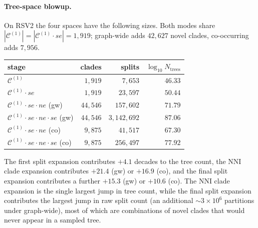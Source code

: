 \documentclass{article}
\newcommand{\CC}{\mathcal{C}}
\begin{document}
\paragraph{Tree-space blowup.}
On RSV2 the four spaces have the following sizes. Both modes share
$|\CC^{(1)}|=|\CC^{(1)}\!\cdot se|=1{,}919$; graph-wide adds $42{,}627$ novel
clades, co-occurring adds $7{,}956$.
\begin{center}
\renewcommand{\arraystretch}{1.1}
\begin{tabular}{lrrr}
\hline
stage & clades & splits & $\log_{10} N_{\text{trees}}$ \\
\hline
$\CC^{(1)}$ & $1{,}919$ & $7{,}653$ & $46.33$ \\
$\CC^{(1)}\!\cdot se$ & $1{,}919$ & $23{,}597$ & $50.44$ \\
$\CC^{(1)}\!\cdot se\cdot ne$ (gw) & $44{,}546$ & $157{,}602$ & $71.79$ \\
$\CC^{(1)}\!\cdot se\cdot ne\cdot se$ (gw) & $44{,}546$ & $3{,}142{,}692$ & $87.06$ \\
$\CC^{(1)}\!\cdot se\cdot ne$ (co) & $9{,}875$ & $41{,}517$ & $67.30$ \\
$\CC^{(1)}\!\cdot se\cdot ne\cdot se$ (co) & $9{,}875$ & $256{,}497$ & $77.92$ \\
\hline
\end{tabular}
\end{center}
The first split expansion contributes $+4.1$ decades to the tree count, the NNI
clade expansion contributes $+21.4$ (gw) or $+16.9$ (co), and the final split
expansion contributes a further $+15.3$ (gw) or $+10.6$ (co). The NNI clade
expansion is the single largest jump in tree count, while the final split
expansion contributes the largest jump in raw split count (an additional
$\sim 3\times 10^6$ partitions under graph-wide), most of which are combinations
of novel clades that would never appear in a sampled tree.
\end{document}
